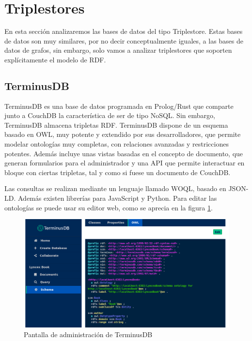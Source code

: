 \documentclass[openright,twoside,12pt]{book}
\begin{document}
\section{Triplestores}

En esta sección analizaremos las bases de datos del tipo Triplestore. Estas bases de datos son muy similares, por no decir conceptualmente iguales, a las bases de datos de grafos, sin embargo, solo vamos a analizar triplestores que soporten explícitamente el modelo de RDF.

\subsection{TerminusDB}
TerminusDB es una base de datos programada en Prolog/Rust que comparte junto a CouchDB la característica de ser de tipo NoSQL\cite{terminusdb}.
Sin embargo, TerminusDB almacena tripletas RDF.
TerminusDB dispone de un esquema basado en OWL, muy potente y extendido por sus desarrolladores, que permite modelar ontologías muy completas, con relaciones avanzadas y restricciones potentes. Además incluye unas vistas basadas en el concepto de documento, que generan formularios para el administrador y una API que permite interactuar en bloque con ciertas tripletas, tal y como si fuese un documento de CouchDB.

Las consultas se realizan mediante un lenguaje llamado WOQL, basado en JSON-LD. Además existen librerías para JavaScript y Python. Para editar las ontologías se puede usar su editor web, como se aprecia en la figura \ref{fig:terminusdb}.

\begin{figure}[h]
    \centering
    \includegraphics[width=\textwidth]{terminusdb.png}
    \caption{Pantalla de administración de TerminusDB}
    \label{fig:terminusdb}
\end{figure}
\end{document}
